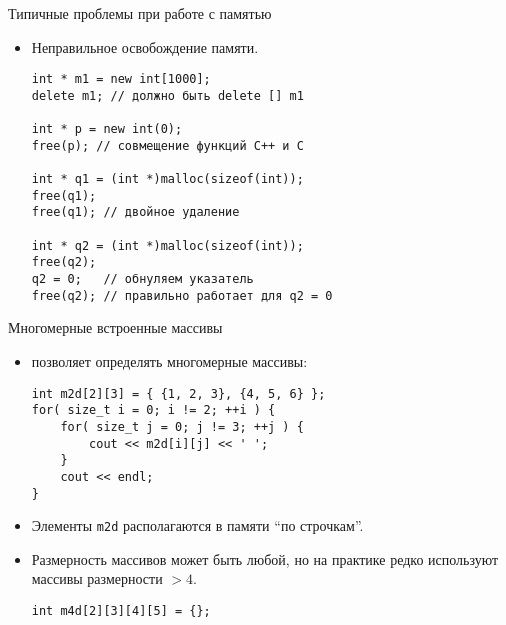 \documentclass{beamer}
\begin{document}
\begin{frame}[fragile]{Типичные проблемы при работе с памятью}
    \begin{itemize}
    \item Неправильное освобождение памяти.
\begin{lstlisting}
int * m1 = new int[1000];
delete m1; // должно быть delete [] m1

int * p = new int(0);
free(p); // совмещение функций C++ и C

int * q1 = (int *)malloc(sizeof(int));
free(q1);
free(q1); // двойное удаление

int * q2 = (int *)malloc(sizeof(int));
free(q2);
q2 = 0;   // обнуляем указатель
free(q2); // правильно работает для q2 = 0
\end{lstlisting}
\end{itemize}
\end{frame}

\begin{frame}[fragile]{Многомерные встроенные массивы}
    \begin{itemize}
        \item \langcpp позволяет определять многомерные массивы:
        \begin{lstlisting}
int m2d[2][3] = { {1, 2, 3}, {4, 5, 6} };
for( size_t i = 0; i != 2; ++i ) {
    for( size_t j = 0; j != 3; ++j ) {
        cout << m2d[i][j] << ' ';
    }
    cout << endl;
}
        \end{lstlisting}
    \item Элементы {\tt m2d} располагаются в памяти ``по строчкам''.

    \item Размерность массивов может быть любой, но на практике
        редко используют массивы размерности $> 4$.

\begin{lstlisting}
int m4d[2][3][4][5] = {};
\end{lstlisting}
    \end{itemize}
\end{frame}
\end{document}
